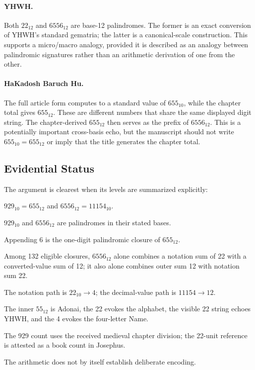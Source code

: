 \medskip

\paragraph{YHWH.}
Both $22_{12}$ and $6556_{12}$ are base-12 palindromes. The former is an exact conversion of YHWH's standard gematria; the latter is a canonical-scale construction. This supports a micro/macro analogy, provided it is described as an analogy between palindromic signatures rather than an arithmetic derivation of one from the other.

\medskip
\paragraph{HaKadosh Baruch Hu.}
The full article form computes to a standard value of $655_{10}$, while the chapter total gives $655_{12}$. These are different numbers that share the same displayed digit string. The chapter-derived $655_{12}$ then serves as the prefix of $6556_{12}$. This is a potentially important cross-basis echo, but the manuscript should not write $655_{10}=655_{12}$ or imply that the title generates the chapter total.

\subsection{Evidential Status}

The argument is clearest when its levels are summarized explicitly:

\begin{description}[leftmargin=4.3cm,style=multiline]
\item[Exact arithmetic] $929_{10}=655_{12}$ and $6556_{12}=11154_{10}$.
\item[Exact symmetry] $929_{10}$ and $6556_{12}$ are palindromes in their stated bases.
\item[Defined construction] Appending 6 is the one-digit palindromic closure of $655_{12}$.
\item[Finite comparison] Among 132 eligible closures, $6556_{12}$ alone combines a notation sum of 22 with a converted-value sum of 12; it also alone combines outer sum 12 with notation sum 22.
\item[Exact collapse] The notation path is $22_{10}\rightarrow4$; the decimal-value path is $11154\rightarrow12$.
\item[Interpretation] The inner $55_{12}$ is Adonai, the 22 evokes the alphabet, the visible 22 string echoes YHWH, and the 4 evokes the four-letter Name.
\item[Historical basis] The 929 count uses the received medieval chapter division; the 22-unit reference is attested as a book count in Josephus.
\item[Intentionality question] The arithmetic does not by itself establish deliberate encoding.
\end{description}

